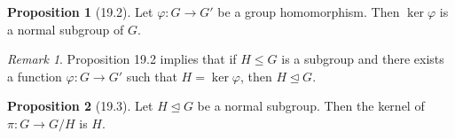 \documentclass{article}
\newcommand{\func}[3]{#1: #2 \to #3}
\theoremstyle{definition}
\newtheorem*{prop}{Proposition}
\theoremstyle{remark}
\newtheorem*{rmk}{Remark}
\newcommand{\normal}{\unlhd}
\begin{document}
{{            \begin{prop}[19.2]
                Let $\func{\varphi}{G}{G'}$ be a group homomorphism. Then $\ker\varphi$ is a normal subgroup of $G$.
            \end{prop}
                
            \begin{rmk}
                Proposition 19.2 implies that if $H\leq G$ is a subgroup and there exists a function $\func{\varphi}{G}{G'}$ such that $H=\ker \varphi$, then $H\normal G$.   
            \end{rmk}
            
            \begin{prop}[19.3]
                Let $H\normal G$ be a normal subgroup. Then the kernel of $\func{\pi}{G}{G/H}$ is $H$.
            \end{prop}
        }
    }
    
\end{document}
